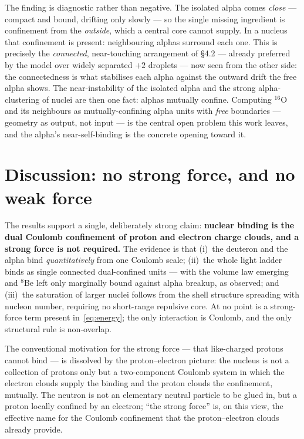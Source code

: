 \documentclass[11pt]{article}
\begin{document}
The finding is diagnostic rather than negative. The isolated alpha comes \emph{close} --- compact
and bound, drifting only slowly --- so the single missing ingredient is confinement from the
\emph{outside}, which a central core cannot supply. In a nucleus that confinement is present:
neighbouring alphas surround each one. This is precisely the \emph{connected}, near-touching
arrangement of \S4.2 --- already preferred by the model over widely separated $+2$ droplets ---
now seen from the other side: the connectedness is what stabilises each alpha against the outward
drift the free alpha shows. The near-instability of the isolated alpha and the strong
alpha-clustering of nuclei are then one fact: alphas mutually confine. Computing $^{16}$O and its
neighbours as mutually-confining alpha units with \emph{free} boundaries --- geometry as output,
not input --- is the central open problem this work leaves, and the alpha's near-self-binding is
the concrete opening toward it.

\section{Discussion: no strong force, and no weak force}

The results support a single, deliberately strong claim: \textbf{nuclear binding is the dual
Coulomb confinement of proton and electron charge clouds, and a strong force is not required.}
The evidence is that (i)~the deuteron and the alpha bind \emph{quantitatively} from one Coulomb
scale; (ii)~the whole light ladder binds as single connected dual-confined units --- with the
volume law emerging and $^8$Be left only marginally bound against alpha breakup, as observed;
and (iii)~the saturation of larger nuclei follows from the shell
structure spreading with nucleon number, requiring no short-range repulsive core. At no point is
a strong-force term present in~\eqref{eq:energy}; the only interaction is Coulomb, and the only
structural rule is non-overlap.

The conventional motivation for the strong force --- that like-charged protons cannot bind ---
is dissolved by the proton--electron picture: the nucleus is not a collection of protons only
but a two-component Coulomb system in which the electron clouds supply the binding and the
proton clouds the confinement, mutually. The neutron is not an elementary neutral particle to be
glued in, but a proton locally confined by an electron; ``the strong force'' is, on this view,
the effective name for the Coulomb confinement that the proton--electron clouds already provide.
\end{document}
